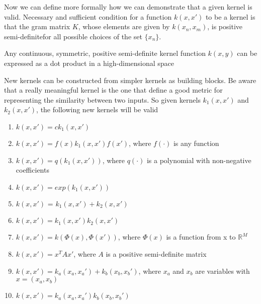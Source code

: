 \documentclass[main.tex]{subfiles}
\begin{document}
Now we can define more formally how we can demonstrate that a given kernel is valid.
Necessary and sufficient condition for a function $k(x, x')$ to be a kernel is that the gram matrix $K$, whose elements are given by $k(x_n, x_m)$, is positive semi-definite\footnotemark for all possible choices of the set $\{x_n\}$.
\begin{theorem}
Any continuous, symmetric, positive semi-definite kernel function $k(x, y)$ can be expressed as a dot product in a high-dimensional space
\end{theorem}
New kernels can be constructed from simpler kernels as building blocks.
Be aware that a really meaningful kernel is the one that define a good metric for representing the similarity between two inputs. 
So given kernels $k_1(x,x')$ and $k_2(x,x')$, the following new kernels will be
valid
\begin{enumerate}
    \item $k(x,x') = ck_1(x,x')$
    \item $k(x,x') = f(x)k_1(x,x')f(x')$, where $f(\cdot)$ is any function
    \item $k(x,x') = q(k_1(x,x'))$, where $q(\cdot)$ is a polynomial with non-negative coefficients
    \item $k(x,x') = exp(k_1(x,x'))$
    \item $k(x,x')$ = $k_1(x,x')+k_2(x,x')$
    \item $k(x,x')=k_1(x,x')k_2(x,x')$
    \item $k(x,x')=k(\Phi(x),\Phi(x'))$, where $\Phi(x)$ is a function from x to $\mathbb{R}^M$
    \item $k(x,x') = x^TAx'$, where $A$ is a positive semi-definite matrix
    \item $k(x,x') = k_a(x_a,x_a') + k_b(x_b,x_b')$, where $x_a$ and $x_b$ are variables with $x=(x_a,x_b)$
    \item $k(x,x')=k_a(x_a,x_a') k_b(x_b,x_b')$
\end{enumerate}
\end{document}
